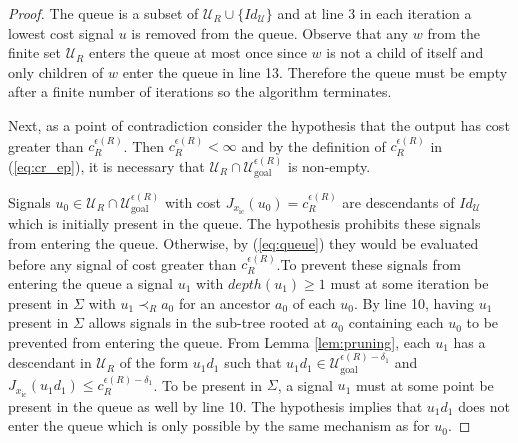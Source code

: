 \documentclass{llncs}
\begin{document}
\begin{proof}
The queue is a subset of $\mathcal{U}_R\cup \{Id_\mathcal{U} \}$ and at line 3 in each iteration a lowest cost signal $u$ is removed from the queue. 
%
Observe that any $w$ from the finite set $\mathcal{U}_R$ enters the queue at most once since $w$ is not a child of itself and only children of $w$ enter the queue in line 13. 
%
Therefore the queue must be empty after a finite number of iterations so the algorithm terminates.

Next, as a point of contradiction consider the hypothesis that the output has cost greater than $c_R^{\epsilon(R)}$. 
%
Then $c_R^{\epsilon(R)}<\infty$ and by the definition of  $c_R^{\epsilon(R)}$  in (\ref{eq:cr_ep}), it is necessary that $\mathcal{U}_{R}\cap \mathcal{U}_\mathrm{goal}^{\epsilon(R)}$ is non-empty. 

Signals $u_0\in \mathcal{U}_{R}\cap\mathcal{U}_\mathrm{goal}^{\epsilon(R)}$ with cost $J_{x_\mathrm{ic}}(u_0)=c_R^{\epsilon(R)}$ are descendants of $Id_\mathcal{U}$ which is initially present in the queue. 
%
The hypothesis prohibits these signals from entering the queue. Otherwise, by (\ref{eq:queue}) they would be evaluated before any signal of cost greater than $c_R^{\epsilon(R)}$.To prevent these signals from entering the queue a signal $u_1$  with $depth(u_1)\geq 1$ must at some iteration be present in $\Sigma$ with $u_1 \prec_R a_0$ for an ancestor $a_0$ of each $u_0$. 
%
By line 10, having $u_1$ present in $\Sigma$ allows signals in the sub-tree rooted at $a_0$ containing each $u_0$ to be prevented from entering the queue. 
%
From Lemma \ref{lem:pruning}, each $u_1$ has a descendant in $\mathcal{U}_R$ of the form $u_1d_1$ such that $u_1d_1\in \mathcal{U}_\mathrm{goal}^{\epsilon(R)-\delta_1}$ and $J_{x_\mathrm{ic}}(u_1d_1)\leq c_R^{\epsilon(R)-\delta_1}$. 
%
To be present in $\Sigma$, a signal $u_1$ must at some point be present in the queue as well by line 10. 
%
The hypothesis implies that $u_1d_1$ does not enter the queue which is only possible by the same mechanism as for $u_0$.
%

%
%


\end{proof}
\end{document}
